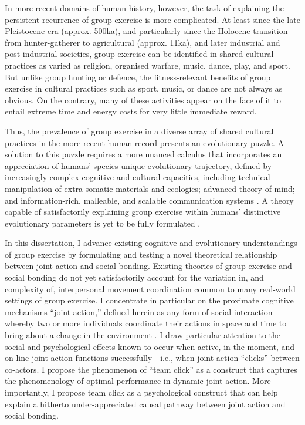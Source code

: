 \begin{CJK}{UTF8}{gbsn}
In more recent domains of human history, however, the task of explaining the persistent recurrence of group exercise is more complicated.  At least since the late Pleistocene era (approx. 500ka), and particularly since the Holocene transition from hunter-gatherer to agricultural (approx. 11ka), and later industrial and post-industrial societies, group exercise can be identified in shared cultural practices as varied as religion, organised warfare, music, dance, play, and sport.  But unlike group hunting or defence, the fitness-relevant benefits of group exercise in cultural practices such as sport, music, or dance are not always as obvious.  On the contrary, many of these activities appear on the face of it to entail extreme time and energy costs for very little immediate reward.

Thus, the prevalence of group exercise in a diverse array of shared cultural practices in the more recent human record presents an evolutionary puzzle.  A solution to this puzzle requires a more nuanced calculus that incorporates an appreciation of humans' species-unique evolutionary trajectory, defined by increasingly complex cognitive and cultural capacities, including technical manipulation of extra-somatic materials and ecologies; advanced theory of mind; and information-rich, malleable, and scalable communication systems \citep{Roepstorff2010,Clark2015,Fuentes2016}.  A theory capable of satisfactorily explaining group exercise within humans' distinctive evolutionary parameters is yet to be fully formulated \citep{Cohen2017}.

In this dissertation, I advance existing cognitive and evolutionary understandings of group exercise by formulating and testing a novel theoretical relationship between joint action and social bonding.  Existing theories of group exercise and social bonding do not yet satisfactorily account for the variation in, and complexity of, interpersonal movement coordination common to many real-world settings of group exercise.  I concentrate in particular on the proximate cognitive mechanisms  ``joint action,'' defined herein as any form of social interaction whereby two or more individuals coordinate their actions in space and time to bring about a change in the environment \citep{Sebanz2006}.  I draw particular attention to the social and psychological effects known to occur when active, in-the-moment, and on-line joint action functions successfully---i.e., when joint action ``clicks'' between co-actors.  I propose the phenomenon of ``team click'' as a construct that captures the phenomenology of optimal performance in dynamic joint action.  More importantly, I propose team click as a psychological construct that can help explain a hitherto under-appreciated causal pathway between joint action and social bonding.


\end{CJK}
